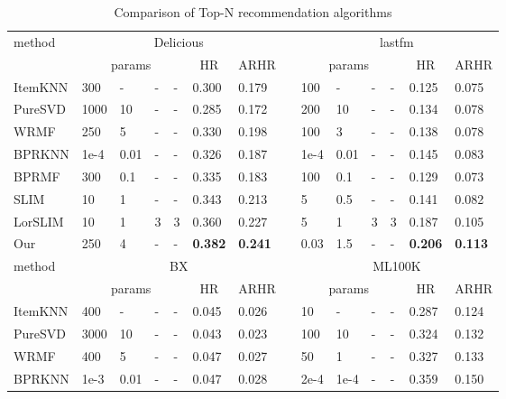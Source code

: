 \documentclass[letterpaper]{article}
\begin{document}
\begin{table}[ht]
\begin{center}
\begin{threeparttable}
%
\caption{Comparison of Top-N recommendation algorithms}
\label{tab:comp}
\tiny
\begin{tabular}{llllllllllllll}
\hline
\multirow{2}{*}{method} &
\multicolumn{6}{c}{Delicious} &
\multicolumn{1}{c}{}&
\multicolumn{6}{c}{lastfm} \\
\cline{2-7} \cline{9-14} 
  & \multicolumn{4}{c}{params} &\multicolumn{1}{c}{HR}  & \multicolumn{1}{c}{ARHR} &\multicolumn{1}{c}{}&\multicolumn{4}{c}{params} &\multicolumn{1}{c}{HR}  & \multicolumn{1}{c}{ARHR} \\ 
\hline
ItemKNN&300&-&-&-&0.300&0.179&&100&-&-&-&0.125&0.075\\
PureSVD&1000&10&-&-&0.285&0.172&&200&10&-&-&0.134&0.078\\
WRMF&250&5&-&-&0.330&0.198&&100&3&-&-&0.138&0.078\\
BPRKNN&1e-4&0.01&-&-&0.326&0.187&&1e-4&0.01&-&-&0.145&0.083\\
BPRMF&300&0.1&-&-&0.335&0.183&&100&0.1&-&-&0.129&0.073\\
SLIM&10&1&-&-&0.343&0.213&&5&0.5&-&-&0.141&0.082\\
LorSLIM&10&1&3&3&0.360&0.227&&5&1&3&3&0.187&0.105\\
Our&250&4&-&-&\bf{0.382}&\bf{0.241}&&0.03&1.5&-&-&\bf{0.206}&\bf{0.113}\\
\hline\hline
\multirow{2}{*}{method} &
\multicolumn{6}{c}{BX} &
\multicolumn{1}{c}{}&
\multicolumn{6}{c}{ML100K} \\
\cline{2-7} \cline{9-14} 
  & \multicolumn{4}{c}{params} &\multicolumn{1}{c}{HR}  & \multicolumn{1}{c}{ARHR} &\multicolumn{1}{c}{}&\multicolumn{4}{c}{params} &\multicolumn{1}{c}{HR}  & \multicolumn{1}{c}{ARHR} \\ 
\hline
ItemKNN&400&-&-&-&0.045&0.026&&10&-&-&-&0.287&0.124\\
PureSVD&3000&10&-&-&0.043&0.023&&100&10&-&-&0.324&0.132\\
WRMF&400&5&-&-&0.047&0.027&&50&1&-&-&0.327&0.133\\
BPRKNN&1e-3&0.01&-&-&0.047&0.028&&2e-4&1e-4&-&-&0.359&0.150\\

\end{tabular}
\end{threeparttable}
\end{center}
\end{table}
\end{document}
